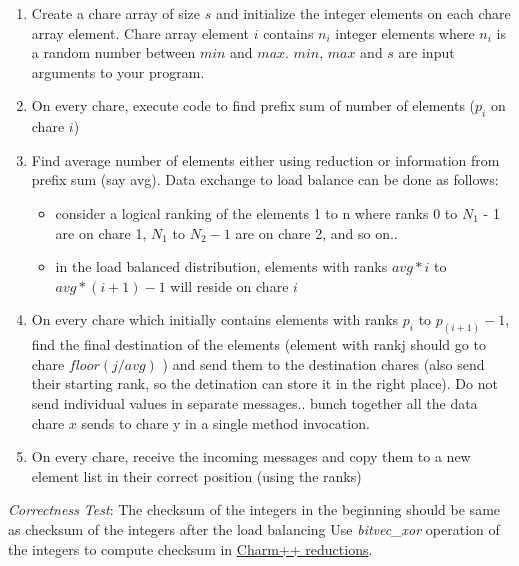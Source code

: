 \documentclass{article}
\begin{document}
\begin{enumerate}

\item Create a chare array of size $s$ and initialize the integer elements on
each chare array element. Chare array element $i$ contains $n_i$ integer
elements where $n_i$ is a random number between $min$ and $max$. $min$,
$max$ and $s$ are input arguments to your program.

\item On every chare, execute code to find prefix sum of number of elements ($p_i$ on chare $i$)
 
\item Find average number of elements either using reduction or information from prefix sum (say avg).
Data exchange to load balance can be done as follows:
\begin{itemize}
\item consider a logical ranking of the elements 1 to n where ranks 0 to $N_1$ - 1 are on chare 1, $N_1$ to $N_2-1$ are on chare 2, and so on..
\item in the load balanced distribution, elements with ranks $avg*i$ to $avg*(i +1)-1$ will reside on chare $i$
\end{itemize}

\item On every chare which initially contains elements with ranks $p_i$ to $p_(i+1) - 1$, find the final destination of the elements (element with rankj should go to chare $floor(j/avg)$ ) and send them to the destination chares (also send their starting rank, so the detination can store it in the right place). Do not send individual values in separate messages.. bunch together all the data chare $x$ sends to chare y in a single method invocation.

\item On every chare, receive the incoming messages and copy them to a new element list in their correct position (using the ranks)
 
\end{enumerate}

\emph{Correctness Test}: The checksum of the integers in the beginning
should be same as checksum of the integers after the load balancing
Use \emph{bitvec\_xor} operation of the integers to compute checksum in  \href{http://charm.cs.uiuc.edu/manuals/html/charm++/4.html#SECTION01361000000000000000}{ Charm++
reductions}. \\
\end{document}
